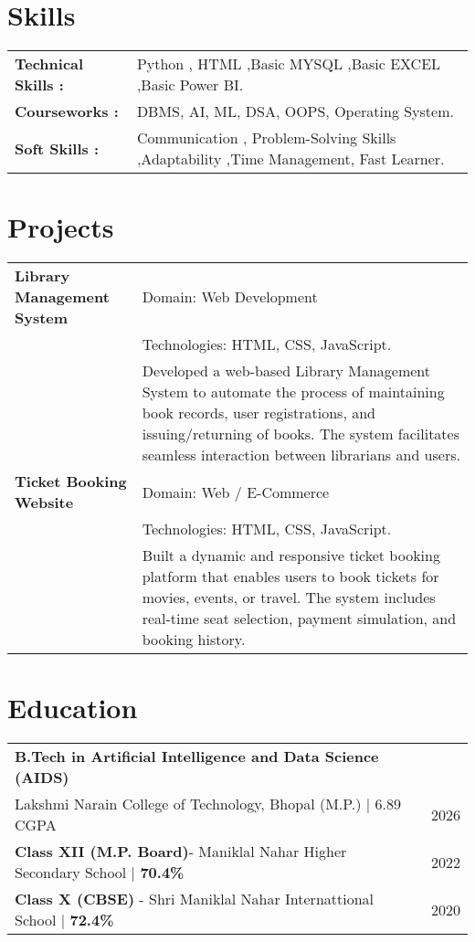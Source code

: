 \documentclass[a4paper,12pt]{article}
\begin{document}
\section{Skills}
\begin{tabularx}{\linewidth}{@{}l X@{}}
\textbf{Technical Skills :} &  \normalsize Python , HTML ,Basic MYSQL ,Basic EXCEL ,Basic Power BI.\\ 
\textbf{Courseworks :} &  \normalsize DBMS, AI, ML, DSA, OOPS, Operating System.\\

\textbf{Soft Skills : } &  \normalsize Communication , Problem-Solving Skills ,Adaptability ,Time Management, Fast Learner. \\
\end{tabularx}
  
\section{Projects}

\begin{tabularx}{\linewidth}{@{}lX@{}}
\textbf{Library Management System} & Domain: Web Development \\
& Technologies: HTML, CSS, JavaScript. \\
& Developed a web-based Library Management System to automate the process of maintaining book records, user registrations, and issuing/returning of books. The system facilitates seamless interaction between librarians and users. \\[6pt]

 
 \textbf{Ticket Booking Website} & Domain: Web / E-Commerce \\
& Technologies: HTML, CSS, JavaScript. \\
& Built a dynamic and responsive ticket booking platform that enables users to book tickets for movies, events, or travel. The system includes real-time seat selection, payment simulation, and booking history. \\
\end{tabularx}



\section{Education}
\begin{tabularx}{\linewidth}{@{}l X@{}}	
\textbf{B.Tech in Artificial Intelligence and Data Science (AIDS)} \\
Lakshmi Narain College of Technology, Bhopal (M.P.) | 6.89 CGPA & \hfill 2026\\

\textbf{Class XII (M.P. Board)}- Maniklal Nahar Higher Secondary School |\textbf{ 70.4\% }  & \hfill 2022 \\
\textbf{Class X (CBSE)} - Shri Maniklal Nahar Internattional School | \textbf{72.4\% } &\hfill 2020 \\
\end{tabularx}
\end{document}
